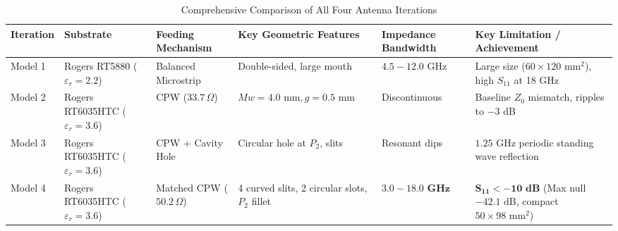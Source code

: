\documentclass[journal,compsoc,twocolumn,10pt]{IEEEtran}
\begin{document}
\begin{table}[htbp]
\caption{Comprehensive Comparison of All Four Antenna Iterations}
\label{tab:comparison_all}
\centering
\begin{tabular}{@{}llllll@{}}
\toprule
\textbf{Iteration} & \textbf{Substrate} & \textbf{Feeding Mechanism} & \textbf{Key Geometric Features} & \textbf{Impedance Bandwidth} & \textbf{Key Limitation / Achievement} \\ \midrule
Model 1 & Rogers RT5880 ($\varepsilon_r=2.2$) & Balanced Microstrip & Double-sided, large mouth & $4.5 - 12.0\text{ GHz}$ & Large size ($60 \times 120\text{ mm}^2$), high $S_{11}$ at 18 GHz \\
Model 2 & Rogers RT6035HTC ($\varepsilon_r=3.6$) & CPW ($33.7\,\Omega$) & $Mw=4.0\text{ mm}, g=0.5\text{ mm}$ & Discontinuous & Baseline $Z_0$ mismatch, ripples to $-3\text{ dB}$ \\
Model 3 & Rogers RT6035HTC ($\varepsilon_r=3.6$) & CPW + Cavity Hole & Circular hole at $P_2$, slits & Resonant dips & $1.25\text{ GHz}$ periodic standing wave reflection \\
Model 4 & Rogers RT6035HTC ($\varepsilon_r=3.6$) & Matched CPW ($50.2\,\Omega$) & 4 curved slits, 2 circular slots, $P_2$ fillet & $\mathbf{3.0 - 18.0\text{ GHz}}$ & $\mathbf{S_{11} < -10\text{ dB}}$ (Max null $-42.1\text{ dB}$, compact $50 \times 98\text{ mm}^2$) \\ \bottomrule
\end{tabular}
\end{table}

\end{document}
